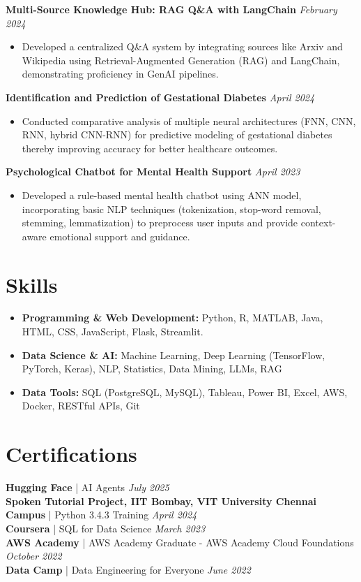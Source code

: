\documentclass[a4paper,10pt]{article}
\begin{document}
\noindent
\textbf{Multi-Source Knowledge Hub: RAG Q&A with LangChain} \hfill \textit{February 2024}
\begin{itemize}[leftmargin=*]
    \item Developed a centralized Q&A system by integrating sources like Arxiv and Wikipedia using Retrieval-Augmented Generation (RAG) and LangChain, demonstrating proficiency in GenAI pipelines.
\end{itemize}

\noindent
\textbf{Identification and Prediction of Gestational Diabetes} \hfill \textit{April 2024}
\begin{itemize}[leftmargin=*]
    \item Conducted comparative analysis of multiple neural architectures (FNN, CNN, RNN, hybrid CNN-RNN) for predictive modeling of gestational diabetes thereby improving accuracy for better healthcare outcomes.
\end{itemize}

\noindent
\textbf{Psychological Chatbot for Mental Health Support} \hfill \textit{April 2023}
\begin{itemize}[leftmargin=*]
    \item  Developed a rule-based mental health chatbot using ANN model, incorporating basic NLP techniques (tokenization, stop-word removal, stemming, lemmatization) to preprocess user inputs and provide context-aware emotional support and guidance.
\end{itemize}

\section{\textbf{Skills}}
\begin{itemize}[left=0pt, itemsep=0pt]
    \item \textbf{Programming & Web Development:} Python, R, MATLAB, Java, HTML, CSS, JavaScript, Flask, Streamlit.
    \item \textbf{Data Science & AI:} Machine Learning, Deep Learning (TensorFlow, PyTorch, Keras), NLP, Statistics, Data Mining, LLMs, RAG
    \item \textbf{Data Tools:} SQL (PostgreSQL, MySQL), Tableau, Power BI, Excel, AWS, Docker, RESTful APIs, Git
\end{itemize}


\section{\textbf{Certifications}}
\textbf{Hugging Face} | AI Agents \hfill \textit{July 2025}\\
\textbf{Spoken Tutorial Project, IIT Bombay, VIT University Chennai Campus} | Python 3.4.3 Training \hfill \textit{April 2024}\\
\textbf{Coursera} | SQL for Data Science \hfill \textit{March 2023}\\ 
\textbf{AWS Academy} | AWS Academy Graduate - AWS Academy Cloud Foundations \hfill \textit{October 2022}\\ 
\textbf{Data Camp} | Data Engineering for Everyone \hfill \textit{June 2022}\\
\end{document}
